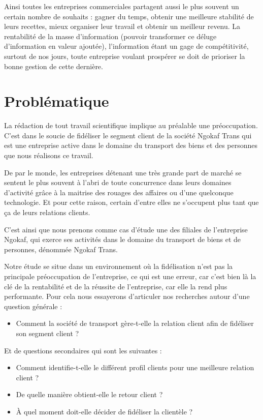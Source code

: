     \par

    Ainsi toutes les entreprises commerciales partagent aussi
    le plus souvent un certain nombre de souhaits : gagner
    du temps, obtenir une meilleure
    stabilité de leurs recettes, mieux organiser leur travail et obtenir un meilleur
    revenu. \cite*{Barouch2010} La rentabilité de la masse d’information (pouvoir transformer ce déluge
    d’information en valeur ajoutée), l’information étant un gage de compétitivité, surtout
    de nos jours, toute entreprise voulant prospérer se doit de prioriser la bonne gestion de
    cette dernière.
    \section[Problématique]{Problématique}
    La rédaction de tout travail scientifique implique au préalable une préoccupation.
    C’est dans le soucie de fidéliser le segment client de la société Ngokaf Trans qui est une
    entreprise active dans le domaine du transport des biens et des personnes que nous
    réalisons ce travail.
    \par
    De par le monde, les entreprises détenant une très grande part de marché
    se sentent le plus souvent à l’abri de toute concurrence
    dans leurs domaines d’activité grâce à la maitrise des rouages des affaires
    ou d’une quelconque technologie. \cite*{Rouviere2010} Et pour cette raison,
    certain d’entre elles ne s’occupent plus tant que ça de leurs relations clients.
    \par
    C’est ainsi que nous prenons comme cas d’étude une des filiales de l’entreprise Ngokaf,
    qui exerce ses activités dans le domaine du transport de biens et de personnes, dénommée
    Ngokaf Trans.
    \par
    Notre étude se situe dans un environnement où la fidélisation n’est pas la principale
    préoccupation de l’entreprise, ce qui est une erreur, car c’est bien là la clé
    de la rentabilité et de la réussite de l’entreprise, car elle la rend plus performante.
    Pour cela nous essayerons d’articuler nos recherches autour d’une question générale :
    \par
        \begin{itemize}
            \item [\ding{226}] Comment la société de transport gère-t-elle la relation client afin de
            fidéliser son segment client ?
        \end{itemize}
    Et de questions secondaires qui sont les suivantes :
    \par
        \begin{itemize}
            \setlength{\itemsep}{0pt}
            \item [\ding{226}] Comment identifie-t-elle le différent profil clients pour une
            meilleure relation client ?
            \item [\ding{226}] De quelle manière obtient-elle le retour client ?
            \item [\ding{226}] À quel moment doit-elle décider de fidéliser la clientèle ?
        \end{itemize}
